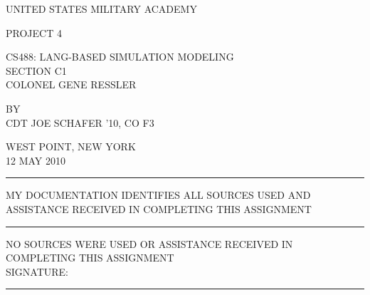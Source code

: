 \begin{titlepage}
  \begin{center}
    \singlespacing
    UNITED STATES MILITARY ACADEMY
    \vfill
    
    PROJECT 4

    \vfill
    
    CS488: LANG-BASED SIMULATION MODELING\\[12pt]
    SECTION C1\\[12pt]
    COLONEL GENE RESSLER

    \vfill
    
    BY\\[12pt]
    CDT JOE SCHAFER '10, CO F3

    \vfill
    
    WEST POINT, NEW YORK \\[12pt]
    12 MAY 2010
  \end{center}

  \vfill

  \begin{flushleft}
    \rule{24pt}{0.5pt}
    MY DOCUMENTATION IDENTIFIES ALL SOURCES USED AND ASSISTANCE
    RECEIVED IN COMPLETING THIS ASSIGNMENT
    \\[12pt]
    
    \rule{24pt}{0.5pt}
    NO SOURCES WERE USED OR ASSISTANCE RECEIVED IN COMPLETING THIS
    ASSIGNMENT
    \\[18pt]

    SIGNATURE: \rule{30em}{0.5pt}\\[12pt]
  \end{flushleft}
\end{titlepage}
